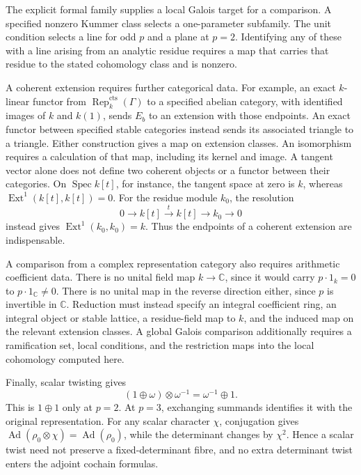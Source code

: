 The explicit formal family supplies a local Galois target for a
comparison. A specified nonzero Kummer class selects a one-parameter
subfamily. The unit condition selects a line for odd \(p\) and a plane
at \(p=2\). Identifying any of these with a line arising from an
analytic residue requires a map that carries that residue to the stated
cohomology class and is nonzero.

A coherent extension requires further categorical data.
For example, an exact \(k\)-linear functor from
\(\operatorname{Rep}^{\mathrm{cts}}_k(\Gamma)\) to a specified abelian category,
with identified images of \(k\) and \(k(1)\), sends \(E_b\) to an
extension with those endpoints. An exact functor between specified
stable categories instead sends its associated triangle to a triangle.
Either construction gives a map on extension classes. An isomorphism
requires a calculation of that map, including its kernel and image.
A tangent vector alone does not define two coherent objects or a functor
between their categories. On \(\operatorname{Spec}k[t]\), for instance,
the tangent space at zero is \(k\), whereas
\(\operatorname{Ext}^1(k[t],k[t])=0\). For the residue module \(k_0\),
the resolution
\[
 0\longrightarrow k[t]\xrightarrow{t}k[t]\longrightarrow k_0\longrightarrow0
\]
instead gives \(\operatorname{Ext}^1(k_0,k_0)=k\).
Thus the endpoints of a coherent extension are indispensable.

A comparison from a complex representation category also requires
arithmetic coefficient data. There is no unital field map
\(k\to\mathbb C\), since it would carry \(p\cdot1_k=0\) to
\(p\cdot1_{\mathbb C}\ne0\). There is no unital map in the reverse
direction either, since \(p\) is invertible in \(\mathbb C\).
Reduction must instead specify an integral coefficient ring, an integral
object or stable lattice, a residue-field map to \(k\), and the induced
map on the relevant extension classes. A global Galois comparison
additionally requires a ramification set, local conditions, and the
restriction maps into the local cohomology computed here.

Finally, scalar twisting gives
\[
 (1\oplus\omega)\otimes\omega^{-1}=\omega^{-1}\oplus1.
\]
This is \(1\oplus1\) only at \(p=2\). At \(p=3\), exchanging summands
identifies it with the original representation.
For any scalar character \(\chi\), conjugation gives
\(\operatorname{Ad}(\rho_0\otimes\chi)=\operatorname{Ad}(\rho_0)\),
while the determinant changes by \(\chi^2\).
Hence a scalar twist need not preserve a fixed-determinant fibre, and
no extra determinant twist enters the adjoint cochain formulas.


